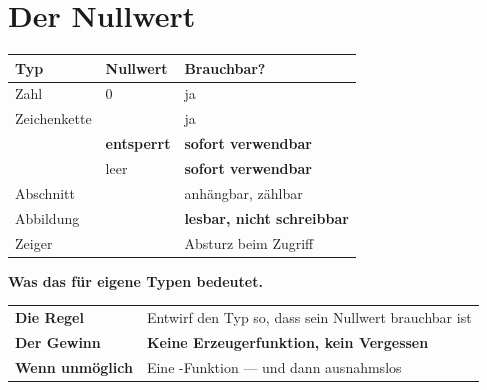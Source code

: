 \chapter{Der Nullwert}\label{kap:nullwert}

\begin{merksatz}
\begin{center}
\renewcommand{\arraystretch}{1.5}
\begin{tabular}{@{}P{2.8cm}P{2.2cm}P{3.0cm}@{}}
\toprule
\textbf{Typ} & \textbf{Nullwert} & \textbf{Brauchbar?}\\
\midrule
Zahl & $0$ & \textcolor{gruen}{ja}\\
Zeichenkette &  & \textcolor{gruen}{ja}\\
 & \textbf{entsperrt} & \textcolor{gruen}{\textbf{sofort verwendbar}}\\
 & leer & \textcolor{gruen}{\textbf{sofort verwendbar}}\\
Abschnitt &  & \textcolor{gruen}{anhängbar, zählbar}\\
Abbildung &  & \textcolor{akzent}{\textbf{lesbar, nicht schreibbar}}\\
Zeiger &  & \textcolor{akzent}{Absturz beim Zugriff}\\
\bottomrule
\end{tabular}
\end{center}

\begin{center}
\begin{minipage}{0.88\textwidth}
\end{minipage}
\end{center}

\textbf{Was das für eigene Typen bedeutet.}

\begin{center}
\renewcommand{\arraystretch}{1.55}
\begin{tabular}{@{}P{2.8cm}P{6.2cm}@{}}
\toprule
\textbf{Die Regel} & Entwirf den Typ so, dass sein Nullwert brauchbar ist\\
\textbf{Der Gewinn} & \textbf{Keine Erzeugerfunktion, kein Vergessen}\\
\textbf{Wenn unmöglich} & Eine -Funktion --- und dann ausnahmslos\\
\bottomrule
\end{tabular}
\end{center}


\end{merksatz}
